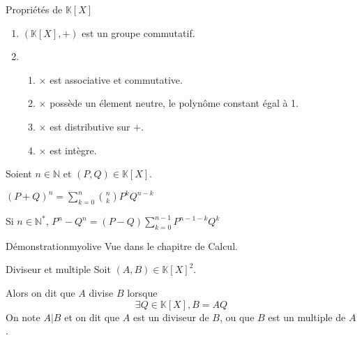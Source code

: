     \begin{prop}{Propriétés de $\mathbb{K}[X]$}{}
        \begin{enumerate}
            \item $(\mathbb{K}[X],+)$ est un groupe commutatif.
            \item \begin{enumerate}[label=\alph*.]
                \item $\times$ est associative et commutative.
                \item $\times$ possède un élement neutre, le polynôme constant égal à 1.
                \item $\times$ est distributive sur $+$.
                \item $\times$ est intègre.
            \end{enumerate}
        \end{enumerate}
    \end{prop}

    \begin{prop}{}{}
        Soient $n \in \mathbb{N}$ et $(P,Q) \in \mathbb{K}[X]$.

        \begin{alors}
            \item $(P + Q)^n = \sum\limits_{k=0}^n \binom{n}{k} P^k Q^{n-k}$
            \item Si $n \in \mathbb{N}^*$, $P^n - Q^n = (P-Q)\sum\limits_{k=0}^{n-1} P^{n-1-k} Q^k $
        \end{alors}
    \end{prop}

    \begin{demo}{Démonstration}{myolive}
        Vue dans le chapitre de Calcul.
    \end{demo}

    \begin{defi}{Diviseur et multiple}{}
        Soit $(A,B) \in \mathbb{K}[X]^2$.
    
        Alors on dit que $A$ divise $B$ lorsque \[ \exists Q \in \mathbb{K}[X], B = AQ \]
        On note $A | B$ et on dit que $A$ est un diviseur de $B$, ou que $B$ est un multiple de $A$.
    \end{defi}
    
